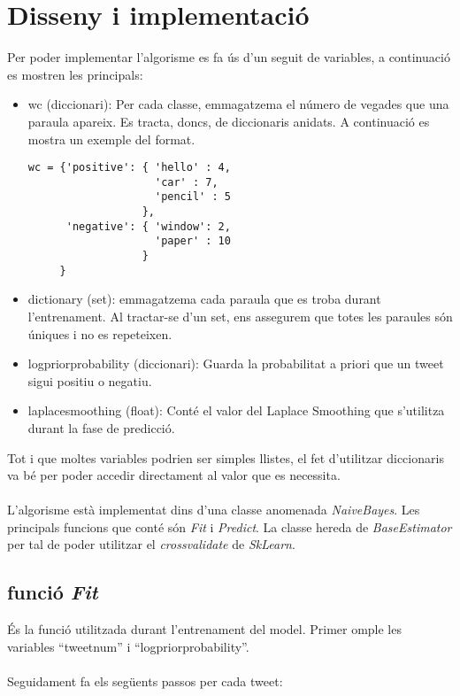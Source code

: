 \chapter{Disseny i implementació}
Per poder implementar l’algorisme es fa ús d’un seguit de variables, a continuació es mostren les principals:

\begin{itemize}
\item wc (diccionari): Per cada classe, emmagatzema el número de vegades que una paraula apareix. Es tracta, doncs, de diccionaris anidats. A continuació es mostra un exemple del format.\\
\begin{lstlisting}
wc = {'positive': { 'hello' : 4,
                    'car' : 7,
                    'pencil' : 5
                  },
      'negative': { 'window': 2,
                    'paper' : 10
                  }
     }

\end{lstlisting}
\item dictionary (set): emmagatzema cada paraula que es troba durant l’entrenament. Al tractar-se d’un set, ens assegurem que totes les paraules són úniques i no es repeteixen.
\item log\textunderscore prior\textunderscore probability (diccionari): Guarda la probabilitat a priori que un tweet sigui positiu o negatiu.
\item laplace\textunderscore smoothing (float): Conté el valor del Laplace Smoothing que s’utilitza durant la fase de predicció. 
\end{itemize}

Tot i que moltes variables podrien ser simples llistes, el fet d’utilitzar diccionaris va bé per poder accedir directament al valor que es necessita.\\\\
L’algorisme està implementat dins d’una classe anomenada \textit{NaiveBayes}. Les principals funcions que conté són \textit{Fit} i \textit{Predict}.  La classe hereda de \textit{BaseEstimator} per tal de poder utilitzar el \textit{cross\textunderscore validate} de \textit{SkLearn}.

\section{funció \textit{Fit}}
És la funció utilitzada durant l’entrenament del model. Primer omple les variables “tweet\textunderscore num” i “log\textunderscore prior\textunderscore probability”.\\\\
Seguidament fa els següents passos per cada tweet:

